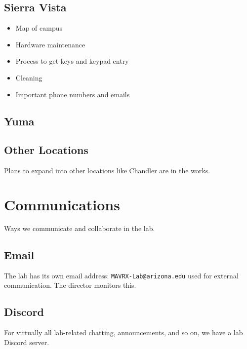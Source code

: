 \documentclass[]{tufte-book}
\providecommand{\tightlist}{%
  \setlength{\itemsep}{0pt}\setlength{\parskip}{0pt}}
\begin{document}
\hypertarget{sierra-vista}{%
\section{Sierra Vista}\label{sierra-vista}}

\begin{itemize}
\tightlist
\item
  Map of campus
\item
  Hardware maintenance
\item
  Process to get keys and keypad entry
\item
  Cleaning
\item
  Important phone numbers and emails
\end{itemize}

\hypertarget{yuma}{%
\section{Yuma}\label{yuma}}

\hypertarget{other-locations}{%
\section{Other Locations}\label{other-locations}}

Plans to expand into other locations like Chandler are in the works.

\hypertarget{comms}{%
\chapter{Communications}\label{comms}}

Ways we communicate and collaborate in the lab.

\hypertarget{email}{%
\section{Email}\label{email}}

The lab has its own email address: \texttt{MAVRX-Lab@arizona.edu} used for external communication. The director monitors this.

\hypertarget{discord}{%
\section{Discord}\label{discord}}

For virtually all lab-related chatting, announcements, and so on, we have a lab Discord server.
\end{document}
